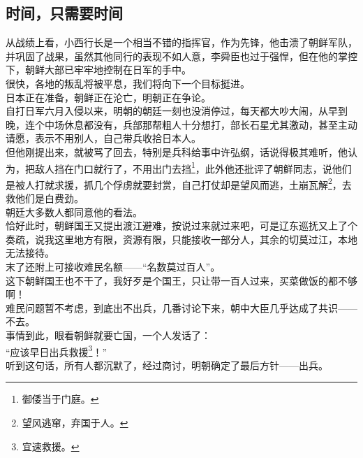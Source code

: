 	\begin{multicols}{\theparacolNo}
\fi
\subsection{时间，只需要时间}
从战绩上看，小西行长是一个相当不错的指挥官，作为先锋，他击溃了朝鲜军队，并巩固了战果，虽然其他同行的表现不如人意，李舜臣也过于强悍，但在他的掌控下，朝鲜大部已牢牢地控制在日军的手中。\\

很快，各地的叛乱将被平息，我们将向下一个目标挺进。\\

日本正在准备，朝鲜正在沦亡，明朝正在争论。\\

自打日军六月入侵以来，明朝的朝廷一刻也没消停过，每天都大吵大闹，从早到晚，连个中场休息都没有，兵部那帮粗人十分想打，部长石星尤其激动，甚至主动请愿，表示不用别人，自己带兵收拾日本人。\\

但他刚提出来，就被骂了回去，特别是兵科给事中许弘纲，话说得极其难听，他认为，把敌人挡在门口就行了，不用出门去挡\footnote{御倭当于门庭。}，此外他还批评了朝鲜同志，说他们是被人打就求援，抓几个俘虏就要封赏，自己打仗却是望风而逃，土崩瓦解\footnote{望风逃窜，弃国于人。}，去救他们是白费劲。\\

朝廷大多数人都同意他的看法。\\

恰好此时，朝鲜国王又提出渡江避难，按说过来就过来吧，可是辽东巡抚又上了个奏疏，说我这里地方有限，资源有限，只能接收一部分人，其余的切莫过江，本地无法接待。\\

末了还附上可接收难民名额——“名数莫过百人”。\\

这下朝鲜国王也不干了，我好歹是个国王，只让带一百人过来，买菜做饭的都不够啊！\\

难民问题暂不考虑，到底出不出兵，几番讨论下来，朝中大臣几乎达成了共识——不去。\\

事情到此，眼看朝鲜就要亡国，一个人发话了：\\

“应该早日出兵救援\footnote{宜速救援。}！”\\

听到这句话，所有人都沉默了，经过商讨，明朝确定了最后方针——出兵。\\


\end{multicols}
